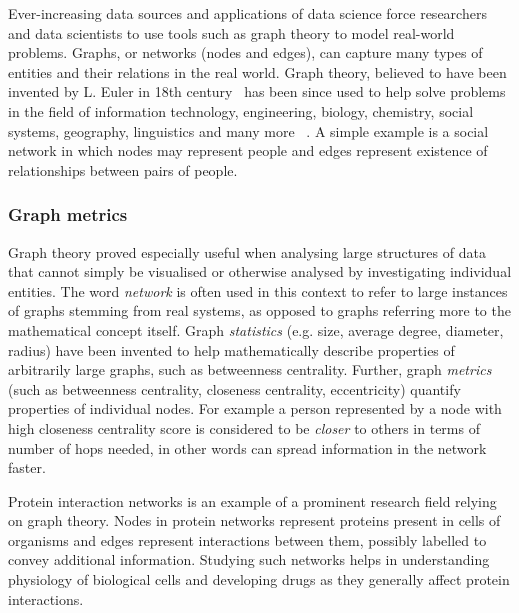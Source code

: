 Ever-increasing data sources and applications of data science force researchers and data scientists to use tools such as graph theory to model real-world problems.
Graphs, or networks (nodes and edges), can capture many types of entities and their relations in the real world.
Graph theory, believed to have been invented by L. Euler in 18th century~\cite{BiggsGraphTheory173619361986} has been since used to help solve problems in the field of information technology, engineering, biology, chemistry, social systems, geography, linguistics and many more ~\cite{FouldsGraphTheoryApplications2012}.
A simple example is a social network in which nodes may represent people and edges represent existence of relationships between pairs of people.

\subsubsection*{Graph metrics}

Graph theory proved especially useful when analysing large structures of data that cannot simply be visualised or otherwise analysed by investigating individual entities.
The word \textsl{network} is often used in this context to refer to large instances of graphs stemming from real systems, as opposed to graphs referring more to the mathematical concept itself.
Graph \textsl{statistics} (e.g. size, average degree, diameter, radius) have been invented to help mathematically describe properties of arbitrarily large graphs, such as betweenness centrality.
Further, graph \textsl{metrics} (such as betweenness centrality, closeness centrality, eccentricity) quantify properties of individual nodes.
For example a person represented by a node with high closeness centrality score is considered to be \textsl{closer} to others in terms of number of hops needed, in other words can spread information in the network faster.

Protein interaction networks is an example of a prominent research field relying on graph theory.
Nodes in protein networks represent proteins present in cells of organisms and edges represent interactions between them, possibly labelled to convey additional information.
Studying such networks helps in understanding physiology of biological cells and developing drugs as they generally affect protein interactions.

